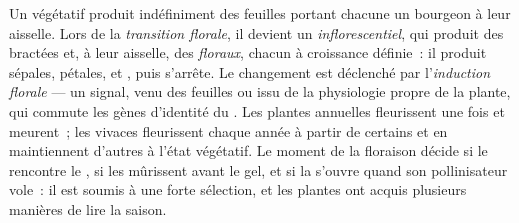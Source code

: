 \begin{definition}\label{def:b2:plant-flowering:transition}
Un  végétatif produit indéfiniment des
feuilles portant chacune un bourgeon à leur aisselle. Lors de la
\emph{transition florale}, il devient un \emph{
inflorescentiel}, qui produit des bractées et, à leur aisselle, des
\emph{ floraux}, chacun à croissance définie~: il produit
sépales, pétales,  et , puis s'arrête. Le changement
est déclenché par l'\emph{induction florale} --- un signal, venu des
feuilles ou issu de la physiologie propre de la plante, qui commute les
gènes d'identité du . Les plantes annuelles fleurissent une
fois et meurent~; les vivaces fleurissent chaque année à partir de
certains  et en maintiennent d'autres à l'état végétatif. Le
moment de la floraison décide si le  rencontre le , si les
 mûrissent avant le gel, et si la  s'ouvre quand son
pollinisateur vole~: il est soumis à une forte sélection, et les plantes
ont acquis plusieurs manières de lire la saison.
\end{definition}

